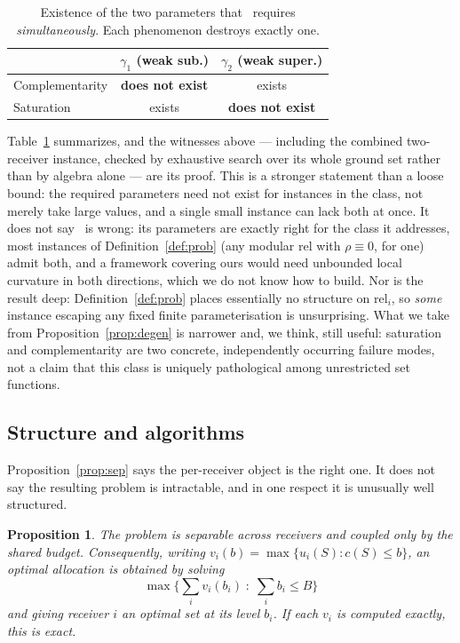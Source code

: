 \documentclass[sigconf,anonymous]{aamas}
\newtheorem{proposition}{Proposition}
\theoremstyle{remark}
\begin{document}
\begin{table}[t]
\centering
\caption{Existence of the two parameters that~\cite{shilai2024}
requires \emph{simultaneously}. Each phenomenon destroys exactly one.}
\label{tab:degen}
\begin{tabular}{lcc}
\toprule
 & $\gamma_1$ (weak sub.) & $\gamma_2$ (weak super.) \\
\midrule
Complementarity & \textbf{does not exist} & exists \\
Saturation      & exists & \textbf{does not exist} \\
\bottomrule
\end{tabular}
\end{table}

Table~\ref{tab:degen} summarizes, and the witnesses above --- including
the combined two-receiver instance, checked by exhaustive search over
its whole ground set rather than by algebra alone --- are its proof.
This is a stronger statement than a loose bound: the required
parameters need not exist for instances in the class, not merely take
large values, and a single small instance can lack both at once. It
does not say~\cite{shilai2024} is wrong: its parameters are exactly
right for the class it addresses, most instances of
Definition~\ref{def:prob} (any modular $\mathrm{rel}$ with
$\rho\equiv0$, for one) admit both, and a framework covering ours would
need unbounded local curvature in both directions, which we do not
know how to build. Nor is the result deep: Definition~\ref{def:prob}
places essentially no structure on $\mathrm{rel}_i$, so \emph{some}
instance escaping any fixed finite parameterisation is unsurprising.
What we take from Proposition~\ref{prop:degen} is narrower and, we
think, still useful: saturation and complementarity are two concrete,
independently occurring failure modes, not a claim that this class is
uniquely pathological among unrestricted set functions.

\subsection{Structure and algorithms}
\label{sec:alg}

Proposition~\ref{prop:sep} says the per-receiver object is the right
one. It does not say the resulting problem is intractable, and in one
respect it is unusually well structured.

\begin{proposition}
\label{prop:decomp}
The problem is separable across receivers and coupled only by the
shared budget. Consequently, writing
$v_i(b) = \max\{u_i(S) : c(S) \le b\}$, an optimal allocation is
obtained by solving
\[
\max\Big\{ \textstyle\sum_i v_i(b_i) \;:\; \sum_i b_i \le B \Big\}
\]
and giving receiver $i$ an optimal set at its level $b_i$. If each
$v_i$ is computed exactly, this is exact.
\end{proposition}
\end{document}
